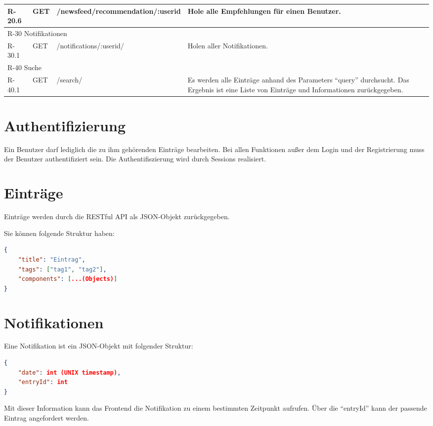 \begin{tabularx}{\textwidth}{|l|l|l|X|}
    R-20.6 & GET & /newsfeed/recommendation/:userid & Hole alle Empfehlungen für einen Benutzer. \\

    \hline
    \multicolumn{4}{|l|}{R-30 Notifikationen}\\
    \hline
    R-30.1 & GET & /notifications/:userid/ & Holen aller Notifikationen.\\ 

    \hline
    \multicolumn{4}{|l|}{R-40 Suche}\\
    \hline
    R-40.1 & GET & /search/ & Es werden alle Einträge anhand des Parameters \enquote{query} durchsucht.
                                Das Ergebnis ist eine Liste von Einträge und Informationen zurückgegeben.\\

\end{tabularx}

\section{Authentifizierung}
Ein Benutzer darf lediglich die zu ihm gehörenden Einträge bearbeiten. 
Bei allen Funktionen außer dem Login und der Registrierung muss der Benutzer authentifiziert sein.
Die Authentifiszierung wird durch Sessions realisiert.

\section{Einträge}
Einträge werden durch die RESTful API als JSON-Objekt zurückgegeben.

Sie können folgende Struktur haben:

\begin{lstlisting}[language=JSON]
{
    "title": "Eintrag",
    "tags": ["tag1", "tag2"],
    "components": [...(Objects)]
}
\end{lstlisting}

\section{Notifikationen}
Eine Notifikation ist ein JSON-Objekt mit folgender Struktur:

\begin{lstlisting}[language=JSON]
{
    "date": int (UNIX timestamp),
    "entryId": int
}
\end{lstlisting}

Mit dieser Information kann das Frontend die Notifikation zu einem bestimmten Zeitpunkt aufrufen. Über die \enquote{entryId} kann der passende Eintrag angefordert werden.

